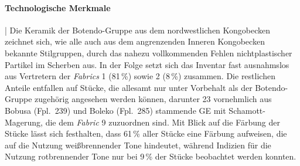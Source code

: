 \paragraph{Technologische Merkmale}\hspace{-.5em}|\hspace{.5em}%
Die Keramik der Botendo-Gruppe aus dem nordwestlichen Kongobecken zeichnet sich, wie alle auch aus dem angrenzenden Inneren Kongobecken bekannte Stilgruppen, durch das nahezu vollkommenden Fehlen nichtplastischer Partikel im Scherben aus. In der Folge setzt sich das Inventar fast ausnahmslos aus Vertretern der \textit{Fabrics} 1 (81\,\%) sowie 2 (8\,\%) zusammen. Die restlichen Anteile entfallen auf Stücke, die allesamt nur unter Vorbehalt als der Botendo-Gruppe zugehörig angesehen werden können, darunter 23 vornehmlich aus Bobusa (Fpl.~239) und Boleko (Fpl.~285) stammende GE mit Schamott-Magerung, die dem \textit{Fabric} 9 zuzuordnen sind. Mit Blick auf die Färbung der Stücke lässt sich festhalten, dass 61\,\% aller Stücke eine Färbung aufweisen, die auf die Nutzung weißbrennender Tone hindeutet, während Indizien für die Nutzung rotbrennender Tone nur bei 9\,\% der Stücke beobachtet werden konnten. 

